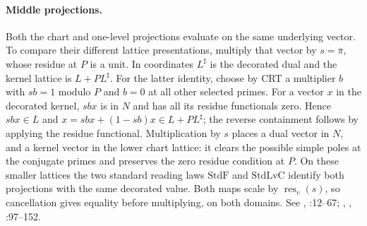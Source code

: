 \paragraph{Middle projections.}
Both the chart and one-level projections evaluate on the same underlying
vector. To compare their different lattice presentations, multiply that
vector by $s=\bar\pi$, whose residue at $P$ is a unit. In coordinates
$L^\sharp$ is the decorated dual and the kernel lattice is
$L+P L^\sharp$. For the latter identity, choose by CRT a multiplier
$b$ with $sb=1$ modulo $P$ and $b=0$ at all other selected primes.
For a vector $x$ in the decorated kernel, $sbx$ is in $N$ and has all
its residue functionals zero. Hence $sbx\in L$ and
$x=sbx+(1-sb)x\in L+P L^\sharp$; the reverse containment follows
by applying the residue functional. Multiplication by $s$ places a
dual vector in $N$, and a kernel vector in the lower chart lattice:
it clears the possible simple poles at the conjugate primes and
preserves the zero residue condition at $P$.
On these smaller lattices the two standard reading laws
$\mathrm{StdF}$ and $\mathrm{StdLvC}$ identify both projections with
the same decorated value. Both maps scale by $\operatorname{res}_v(s)$,
so cancellation gives equality before multiplying, on both domains.
See ,
:12--67;
, ,
:97--152.

